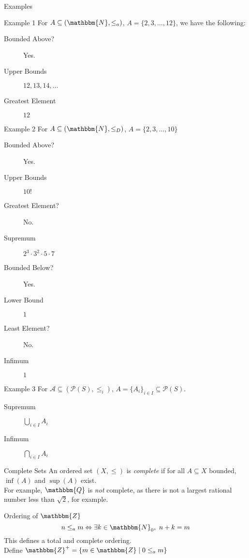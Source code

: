 \documentclass[10pt]{extarticle}
\newcommand{\N}{\mathbbm{N}}
\newcommand{\Q}{\mathbbm{Q}}
\newcommand{\Z}{\mathbbm{Z}}
\begin{document}
  \begin{problem}{Examples}
    \begin{problem}{Example 1}
      For $A\subseteq (\N,\leq_a)$, $A = \{2,3,\dots,12\}$, we have the following:
      \begin{description}
        \item[Bounded Above?] Yes.
        \item[Upper Bounds] $12,13,14,\dots$
        \item[Greatest Element] $12$
      \end{description}
    \end{problem}
    \begin{problem}{Example 2}
    For $A\subseteq (\N,\leq_D)$, $A = \{2,3,\dots,10\}$
    \begin{description}
      \item[Bounded Above?] Yes.
      \item[Upper Bounds] $10!$
      \item[Greatest Element?] No.
      \item[Supremum] $2^3\cdot3^2\cdot5\cdot7$
      \item[Bounded Below?] Yes.
      \item[Lower Bound] $1$
      \item[Least Element?] No.
      \item[Infimum] $1$
    \end{description}
    \end{problem}
    \begin{problem}{Example 3}
      For $\mathcal{A}\subseteq (\mathcal{P}(S),\leq_i)$, $A = \{A_i\}_{i\in I} \subseteq \mathcal{P}(S)$.
      \begin{description}
        \item[Supremum] $\bigcup_{i\in I}A_i$
        \item[Infimum] $\bigcap_{i\in I}A_i$
      \end{description}
    \end{problem}
  \end{problem}
  \begin{problem}{Complete Sets}
    An ordered set $(X,\leq)$ is \textsl{complete} if for all $A\subseteq X$ bounded, $\inf(A)$ and $\sup(A)$ exist.\\

    For example, $\Q$ is \textsl{not} complete, as there is not a largest rational number less than $\sqrt{2}$, for example.
  \end{problem}
  \begin{problem}{Ordering of $\Z$}
    \[
      n\leq_a m \Leftrightarrow \exists k\in \N_0,~n+k=m
    \] 
    This defines a total and complete ordering.\\

    Define $\Z^+ = \{m\in \Z\mid 0\leq_a m\}$
  \end{problem}
\end{document}
